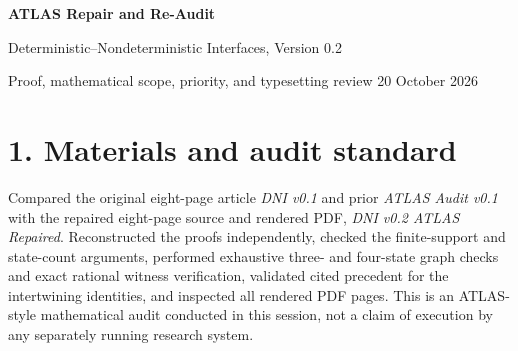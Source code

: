 \documentclass[11pt,letterpaper]{article}
\begin{document}
\begin{center}
{\LARGE\bfseries\color{navy} ATLAS Repair and Re-Audit}\par\vspace{4pt}
{\large Deterministic--Nondeterministic Interfaces, Version 0.2}\par\vspace{4pt}
{\small Proof, mathematical scope, priority, and typesetting review \textbullet{} 20 October 2026}
\end{center}
\vspace{5pt}
\noindent{}

\section*{1. Materials and audit standard}
Compared the original eight-page article \textit{DNI v0.1} and prior \textit{ATLAS Audit v0.1} with the repaired eight-page source and rendered PDF, \textit{DNI v0.2 ATLAS Repaired}. Reconstructed the proofs independently, checked the finite-support and state-count arguments, performed exhaustive three- and four-state graph checks and exact rational witness verification, validated cited precedent for the intertwining identities, and inspected all rendered PDF pages. This is an ATLAS-style mathematical audit conducted in this session, not a claim of execution by any separately running research system.
\end{document}

